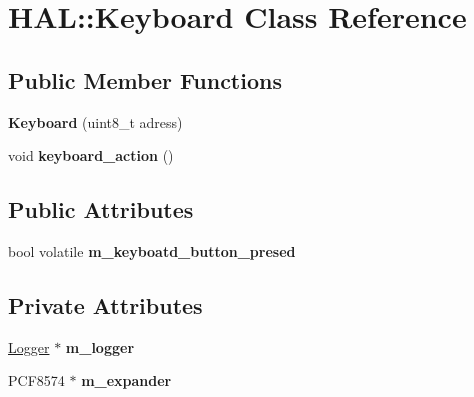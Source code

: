 \hypertarget{class_h_a_l_1_1_keyboard}{}\section{H\+AL\+:\+:Keyboard Class Reference}
\label{class_h_a_l_1_1_keyboard}
\subsection*{Public Member Functions}
\begin{DoxyCompactItemize}
\item 
\mbox{\label{class_h_a_l_1_1_keyboard_a69f58c89860ff8e916137c93a5bbb36d}} 
{\bfseries Keyboard} (uint8\+\_\+t adress)
\item 
\mbox{\label{class_h_a_l_1_1_keyboard_aa588a73b14f12030d85489e73b115ca8}} 
void {\bfseries keyboard\+\_\+action} ()
\end{DoxyCompactItemize}
\subsection*{Public Attributes}
\begin{DoxyCompactItemize}
\item 
\mbox{\label{class_h_a_l_1_1_keyboard_a3261bf1880410c811cd82685f629cb80}} 
bool volatile {\bfseries m\+\_\+keyboatd\+\_\+button\+\_\+presed}
\end{DoxyCompactItemize}
\subsection*{Private Attributes}
\begin{DoxyCompactItemize}
\item 
\mbox{\label{class_h_a_l_1_1_keyboard_a02152635f487ee47b71faa3cf27be8ec}} 
\hyperlink{class_logger}{Logger} $\ast$ {\bfseries m\+\_\+logger}
\item 
\mbox{\label{class_h_a_l_1_1_keyboard_a48d2e6afe16cc41bb6fb5a1eb8f59c32}} 
P\+C\+F8574 $\ast$ {\bfseries m\+\_\+expander}
\end{DoxyCompactItemize}
